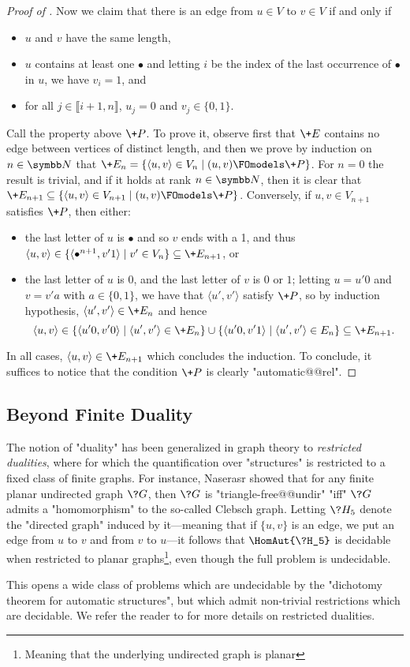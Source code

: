\begin{proof}[Proof of ]
  Now we claim that there is an edge from $u \in V$ to $v \in V$ if and only if
  \begin{itemize}
    \item $u$ and $v$ have the same length,
    \item $u$ contains at least one $\bullet$
      and letting $i$ be the index of the last occurrence of $\bullet$ in $u$,
      we have $v_i = 1$, and
    \item for all $j \in \lBrack i+1,n\rBrack$, $u_j = 0$
    and $v_j \in \{0,1\}$.
  \end{itemize}
  Call the property above $\+P$.
  To prove it, observe first that $\+E$ contains no edge
  between vertices of distinct length, and then we prove
  by induction on $n\in\N$ that $\+E_n = \{\langle u,v\rangle \in V_n \mid (u,v) \FOmodels \+P\}$.
  For $n=0$ the result is trivial, and if it holds at rank $n\in\N$,
  then it is clear that $\+E_{n+1} \subseteq
  \{\langle u,v\rangle \in V_{n+1} \mid (u,v) \FOmodels \+P\}$.
  Conversely, if $u,v \in V_{n+1}$ satisfies $\+P$, then
  either:
  \begin{itemize}
    \item the last letter of $u$ is $\bullet$ and so $v$ ends with a
    1, and thus $\langle u,v \rangle \in \{\langle \bullet^{n+1}, v'1\rangle \mid v'\in V_n\}
    \subseteq \+E_{n+1}$, or 
    \item the last letter of $u$ is $0$, and the last letter of $v$ is $0$ or $1$;
      letting $u = u'0$ and $v = v'a$ with $a \in \{0,1\}$, we have
      that $\langle u', v'\rangle$ satisfy $\+P$, so by induction hypothesis,
      $\langle u', v'\rangle \in \+E_n$ and hence
      \[\langle u,v \rangle \in \{\langle u'0,v'0\rangle \mid \langle u',v'\rangle \in \+E_n\}
      \cup \{\langle u'0,v'1\rangle \mid \langle u',v'\rangle \in E_n\} \subseteq \+E_{n+1}.\]
  \end{itemize}
  In all cases, $\langle u,v\rangle \in \+E_{n+1}$ which concludes the induction.
  To conclude, it suffices to notice that the condition $\+P$ is clearly "automatic@@rel".
\end{proof}


\subsection{Beyond Finite Duality}

The notion of "duality" has been generalized in graph theory to \emph{restricted dualities}, where  
for which the quantification over "structures" is restricted to a fixed class of finite graphs.
For instance, Naserasr showed \cite[Theorem 11]{Naserasr2007PlanarDuality} that 
for any finite planar undirected graph $\?G$, then $\?G$ is "triangle-free@@undir"
"iff" $\?G$ admits a "homomorphism" to the so-called Clebsch graph.
Letting $\?H_5$ denote the "directed graph" induced by it---meaning that if $\{u,v\}$ is an edge,
we put an edge from $u$ to $v$ and from $v$ to $u$---it follows that
$\HomAut{\?H_5}$ is decidable when restricted to planar graphs\footnote{Meaning that the underlying undirected graph is planar}, even though the full problem is undecidable.

This opens a wide class of problems which are undecidable by the "dichotomy theorem for automatic structures", but which admit non-trivial restrictions which are decidable.
We refer the reader to \cite{NesetrilPOM2012RestrictedDualities} for more details on restricted dualities.